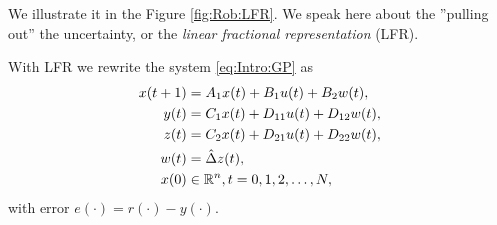 We illustrate it in the Figure \ref{fig:Rob:LFR}. 
We speak here about the ''pulling out'' the uncertainty, or the \textit{linear fractional representation} (LFR). 


With LFR we rewrite the system \eqref{eq:Intro:GP} as 
\begin{align}
\label{eq:uncABCD}
\begin{split}
x(t+1) &= A_1 x(t) + B_1 u(t) + B_2 w(t), \\
y(t)   &= C_1x(t) + D_{11} u(t) + D_{12} w(t), \\
z(t)   &= C_2x(t) + D_{21} u(t) + D_{22}w(t),\\
w(t) &= \hat{\Delta} z(t),\\
x(0)& \in {\mathbb{R}}^{n}, t = 0,1,2, \dots, N, 
\end{split}
\end{align}
with error $e(\cdot) = r(\cdot) - y(\cdot)$. 


